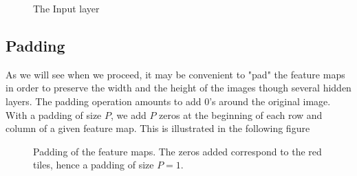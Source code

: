 \begin{figure}[H]
\begin{center}
\caption{\label{fig:input_layer} The Input layer}
\end{center}
\end{figure}

\subsection{Padding}

As we will see when we proceed, it may be convenient to "pad" the feature maps in order to preserve the width and the height of the images though several hidden layers. The padding operation amounts to add $0$'s around the original image. With a padding of size $P$, we add $P$ zeros at the beginning of each row and column of a given feature map. This is illustrated in the following figure

\begin{figure}[H]
\begin{center}
\caption{Padding of the feature maps. The zeros added correspond to the red tiles, hence a padding of size $P=1$.}
\end{center}
\end{figure}

